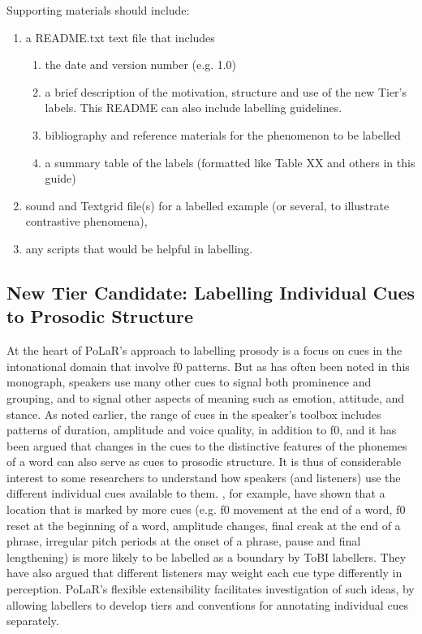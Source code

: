\documentclass[11pt, twoside]{memoir}
\begin{document}
Supporting materials should include:
\begin{enumerate}
	\item a README.txt text  file that includes
	\begin{enumerate}
		\item the date and version number (e.g. 1.0) 
		\item a brief description of the motivation, structure  and use of the new Tier’s labels. This README can also include labelling guidelines.
		\item bibliography and reference materials for the phenomenon to be labelled
		\item a summary table of the labels (formatted like Table XX and others in this guide)
	\end{enumerate}
	\item sound and Textgrid file(s) for a labelled example (or several, to illustrate contrastive phenomena),
	\item any scripts that would be helpful in labelling. 
\end{enumerate}

\subsection{New Tier Candidate: Labelling Individual Cues to Prosodic Structure}\label{sec:labelling-individual-cues}
At the heart of PoLaR’s approach to labelling prosody is a focus on cues in the intonational domain that involve f0 patterns.  But as has often been noted in this monograph, speakers use many other cues to signal both prominence and grouping, and to signal other aspects of meaning such as emotion, attitude, and stance. As noted earlier, the range of cues in the speaker’s toolbox includes patterns of duration, amplitude and voice quality, in addition to f0, and it has been argued that changes in the cues to the distinctive features of the phonemes of a word can also serve as cues to prosodic structure. It is thus of considerable interest to some researchers to understand how speakers (and listeners) use the different individual cues available to them.  \citet{brugos-18}, for example, have shown that a location that is marked by more cues (e.g. f0 movement at the end of a word, f0 reset at the beginning of a word, amplitude changes, final creak at the end of a phrase, irregular pitch periods at the onset of a phrase, pause and final lengthening) is more likely to be labelled as a boundary by ToBI labellers.  They have also argued that different listeners may weight each cue type differently in perception. PoLaR’s flexible extensibility facilitates investigation of such ideas, by allowing labellers to develop tiers and conventions for annotating individual cues separately. 
\end{document}

